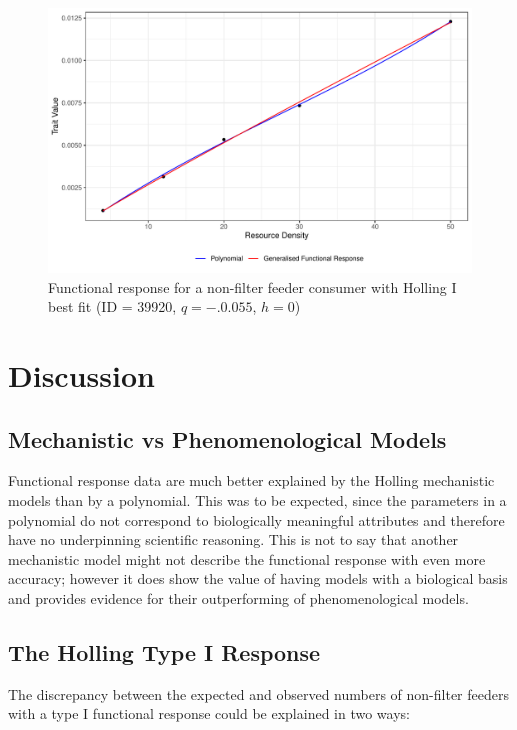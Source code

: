 \documentclass[11pt, a4paper, titlepage]{article}
\begin{document}
\begin{figure}[ht!]
	\centering\includegraphics[width=1\textwidth]{../Results/Holling1_example.pdf}
	\caption{Functional response for a non-filter feeder consumer with Holling I best fit (ID = 39920, $q = -.0.055$, $h = 0$)}
\end{figure}




\section{Discussion}

\subsection{Mechanistic vs Phenomenological Models}

Functional response data are much better explained by the Holling mechanistic models than by a polynomial. This was to be expected, since the parameters in a polynomial do not correspond to biologically meaningful attributes and therefore have no underpinning scientific reasoning.
This is not to say that another mechanistic model might not describe the functional response with even more accuracy; however it does show the value of having models with a biological basis and provides evidence for their outperforming of phenomenological models.

\subsection{The Holling Type I Response}

The discrepancy between the expected and observed numbers of non-filter feeders with a type I functional response could be explained in two ways:
\end{document}
